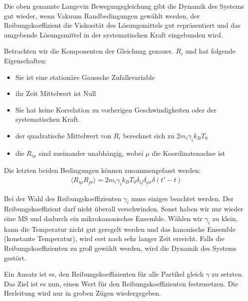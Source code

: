 \documentclass[]{article}
\begin{document}
Die oben genannte Langevin Bewegungsgleichung gibt die Dynamik des Systems gut wieder, wenn Vakuum Randbedingungen gewählt werden, der Reibungskoeffizient die Viskosität des Lösungsmittels gut repräsentiert und das umgebende Lösungsmittel in der systematischen Kraft eingebunden wird. 

Betrachten wir die Komponenten der Gleichung genauer.
$R_i$ und hat folgende Eigenschaften: 
\begin{itemize}
	\item Sie ist eine stationäre Gaussche Zufallsvariable %
	\item ihr Zeit Mittelwert ist Null %
	\item Sie hat keine Korrelation zu vorherigen Geschwindigkeiten oder der systematischen Kraft. 
	\item der quadratische Mittelwert von $R_i$ berechnet sich zu $2 m_i \gamma_i k_B T_0$
	\item die $R_{i \mu}$ sind zueinander unabhängig, wobei $\mu$ die Koordinatenachse ist %
\end{itemize}
Die letzten beiden Bedingungen können zusammengefasst werden: 
\begin{align*}
	\langle R_{i \mu} R_{j \nu } \rangle = 2 m_i \gamma_i k_B T_0 \delta_{ij} \delta_{\mu \nu} \delta(t' - t)
\end{align*}

Bei der Wahl des Reibungskoeffizienten $\gamma_i$ muss einiges beachtet werden. Der Reibungskoeffizient darf nicht überall verschwinden. Sonst haben wir nur wieder eine MS und dadurch ein mikrokanonisches Ensemble. Wählen wir $\gamma_i$ zu klein, kann die Temperatur nicht gut geregelt werden und das kanonische Ensemble (konstante Temperatur), wird erst nach sehr langer Zeit erreicht. Falls die Reibungskoeffizienten zu groß gewählt werden, wird die Dynamik des Systems gestört. 

Ein Ansatz ist es, den Reibungskoeffizienten für alle Partikel gleich $\gamma$ zu setzten. Das Ziel ist es nun, einen Wert für den Reibungskoeffizienten festzusetzen. Die Herleitung wird nur in groben Zügen wiedergegeben. 
\end{document}
